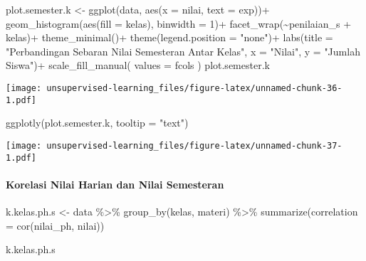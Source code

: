 \documentclass[
]{article}
\newenvironment{Shaded}{\begin{snugshade}}{\end{snugshade}}
\newcommand{\AttributeTok}[1]{\textcolor[rgb]{0.77,0.63,0.00}{#1}}
\newcommand{\DecValTok}[1]{\textcolor[rgb]{0.00,0.00,0.81}{#1}}
\newcommand{\FunctionTok}[1]{\textcolor[rgb]{0.00,0.00,0.00}{#1}}
\newcommand{\NormalTok}[1]{#1}
\newcommand{\OtherTok}[1]{\textcolor[rgb]{0.56,0.35,0.01}{#1}}
\newcommand{\SpecialCharTok}[1]{\textcolor[rgb]{0.00,0.00,0.00}{#1}}
\newcommand{\StringTok}[1]{\textcolor[rgb]{0.31,0.60,0.02}{#1}}
\begin{document}
\begin{Shaded}
\begin{Highlighting}[]
\NormalTok{plot.semester.k }\OtherTok{\textless{}{-}}
\FunctionTok{ggplot}\NormalTok{(data, }\FunctionTok{aes}\NormalTok{(}\AttributeTok{x =}\NormalTok{ nilai, }\AttributeTok{text =}\NormalTok{ exp))}\SpecialCharTok{+}
  \FunctionTok{geom\_histogram}\NormalTok{(}\FunctionTok{aes}\NormalTok{(}\AttributeTok{fill =}\NormalTok{ kelas),}
                 \AttributeTok{binwidth =} \DecValTok{1}\NormalTok{)}\SpecialCharTok{+}
  \FunctionTok{facet\_wrap}\NormalTok{(}\SpecialCharTok{\textasciitilde{}}\NormalTok{penilaian\_s }\SpecialCharTok{+}\NormalTok{ kelas)}\SpecialCharTok{+}
  \FunctionTok{theme\_minimal}\NormalTok{()}\SpecialCharTok{+}
  \FunctionTok{theme}\NormalTok{(}\AttributeTok{legend.position =} \StringTok{"none"}\NormalTok{)}\SpecialCharTok{+}
  \FunctionTok{labs}\NormalTok{(}\AttributeTok{title =} \StringTok{"Perbandingan Sebaran Nilai Semesteran Antar Kelas"}\NormalTok{,}
       \AttributeTok{x =} \StringTok{"Nilai"}\NormalTok{,}
       \AttributeTok{y =} \StringTok{"Jumlah Siswa"}\NormalTok{)}\SpecialCharTok{+}
  \FunctionTok{scale\_fill\_manual}\NormalTok{(}
    \AttributeTok{values =}\NormalTok{ fcols      }
\NormalTok{  )}
\NormalTok{plot.semester.k}
\end{Highlighting}
\end{Shaded}

\texttt{[image: unsupervised-learning\_files/figure-latex/unnamed-chunk-36-1.pdf]}

\begin{Shaded}
\begin{Highlighting}[]
\FunctionTok{ggplotly}\NormalTok{(plot.semester.k, }\AttributeTok{tooltip =} \StringTok{"text"}\NormalTok{)}
\end{Highlighting}
\end{Shaded}

\texttt{[image: unsupervised-learning\_files/figure-latex/unnamed-chunk-37-1.pdf]}

\hypertarget{korelasi-nilai-harian-dan-nilai-semesteran}{%
\paragraph{Korelasi Nilai Harian dan Nilai
Semesteran}\label{korelasi-nilai-harian-dan-nilai-semesteran}}

\begin{Shaded}
\begin{Highlighting}[]
\NormalTok{k.kelas.ph.s }\OtherTok{\textless{}{-}} 
\NormalTok{  data }\SpecialCharTok{\%\textgreater{}\%} 
  \FunctionTok{group\_by}\NormalTok{(kelas, materi) }\SpecialCharTok{\%\textgreater{}\%} 
  \FunctionTok{summarize}\NormalTok{(}\AttributeTok{correlation =} \FunctionTok{cor}\NormalTok{(nilai\_ph, nilai))}

\NormalTok{k.kelas.ph.s}
\end{Highlighting}
\end{Shaded}
\end{document}
